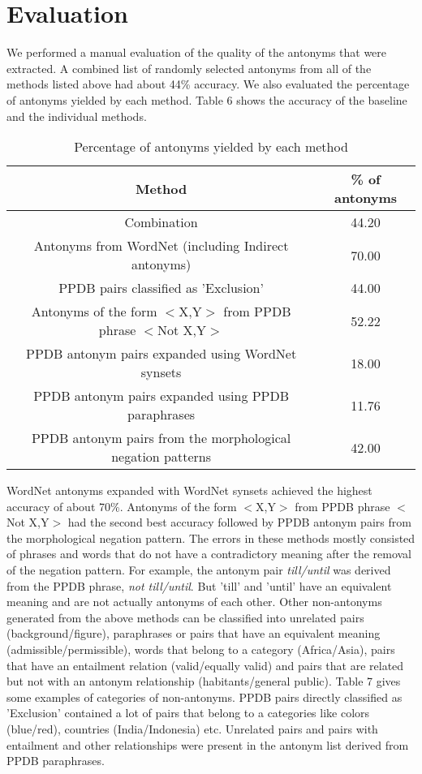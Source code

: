 \documentclass[11pt]{article}
\begin{document}
\section{Evaluation}
We performed a manual evaluation of the quality of the antonyms that were extracted. A combined list of randomly selected antonyms from all of the methods listed above had about 44\% accuracy. We also evaluated the percentage of antonyms yielded by each method. Table 6 shows the accuracy of the baseline and the individual methods.
\begin{table*}[h!]
\centering
 \begin{tabular}{| c | c |} 
 \hline
 Method & \% of antonyms \\ [0.5ex]
 \hline
 Combination & 44.20\\
 Antonyms from WordNet (including Indirect antonyms) & 70.00\\
 PPDB pairs classified as 'Exclusion' & 44.00\\
 Antonyms of the form $<$X,Y$>$ from PPDB phrase $<$Not X,Y$>$ & 52.22\\
 PPDB antonym pairs expanded using WordNet synsets & 18.00\\
 PPDB antonym pairs expanded using PPDB paraphrases & 11.76\\
 PPDB antonym pairs from the morphological negation patterns & 42.00\\
 \hline
\end{tabular}
\caption{Percentage of antonyms yielded by each method}
\end{table*}
WordNet antonyms expanded with WordNet synsets achieved the highest accuracy of about 70\%. Antonyms of the form $<$X,Y$>$ from PPDB phrase $<$Not X,Y$>$ had the second best accuracy followed by PPDB antonym pairs from the morphological negation pattern. The errors in these methods mostly consisted of phrases and words that do not have a contradictory meaning after the removal of the negation pattern. For example, the antonym pair \textit{till/until} was derived from the PPDB phrase, \textit{not till/until}. But 'till' and 'until' have an equivalent meaning and are not actually antonyms of each other. Other non-antonyms generated from the above methods can be classified into unrelated pairs (background/figure), paraphrases or pairs that have an equivalent meaning (admissible/permissible), words that belong to a category (Africa/Asia), pairs that have an entailment relation (valid/equally valid) and pairs that are related but not with an antonym relationship (habitants/general public). Table 7 gives some examples of categories of non-antonyms. PPDB pairs directly classified as 'Exclusion' contained a lot of pairs that belong to a categories like colors (blue/red), countries (India/Indonesia) etc. Unrelated pairs and pairs with entailment and other relationships were present in the antonym list derived from PPDB paraphrases. 
\end{document}
